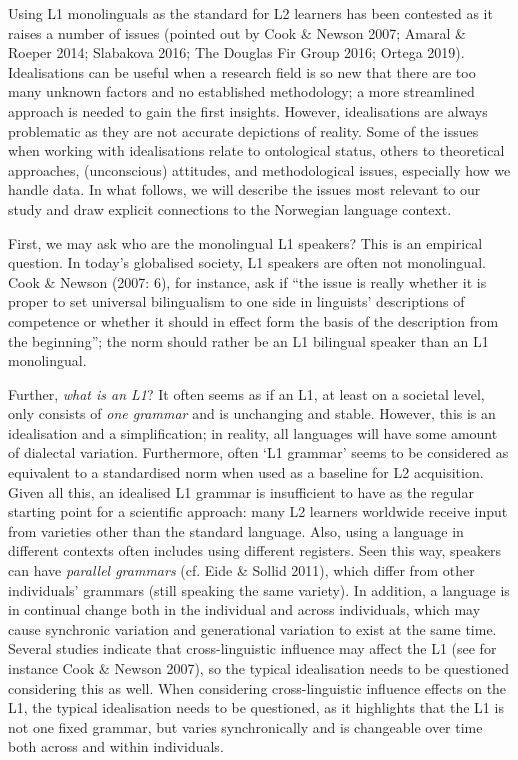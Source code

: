 \documentclass[12pt]{article}
\newenvironment{styleStandard}{\renewcommand\baselinestretch{1.0}\setlength\leftskip{0cm}\setlength\rightskip{0cm plus 1fil}\setlength\parindent{0cm}\setlength\parfillskip{0pt plus 1fil}\setlength\parskip{0in plus 1pt}\writerlistparindent\writerlistleftskip\leavevmode\normalfont\normalsize\writerlistlabel\ignorespaces}{\unskip\vspace{0in plus 1pt}\par}
\newcommand\writerlistleftskip{}
\newcommand\writerlistparindent{}
\newcommand\writerlistlabel{}
\begin{document}
\begin{styleStandard}
Using L1 monolinguals as the standard for L2 learners has been contested as it raises a number of issues (pointed out by Cook \& Newson 2007; Amaral \& Roeper 2014; Slabakova 2016; The Douglas Fir Group 2016; Ortega 2019). Idealisations can be useful when a research field is so new that there are too many unknown factors and no established methodology; a more streamlined approach is needed to gain the first insights. However, idealisations are always problematic as they are not accurate depictions of reality. Some of the issues when working with idealisations relate to ontological status, others to theoretical approaches, (unconscious) attitudes, and methodological issues, especially how we handle data. In what follows, we will describe the issues most relevant to our study and draw explicit connections to the Norwegian language context. 
\end{styleStandard}

\begin{styleStandard}
First, we may ask who are the monolingual L1 speakers? This is an empirical question. In today’s globalised society, L1 speakers are often not monolingual. Cook \& Newson (2007: 6), for instance, ask if “the issue is really whether it is proper to set universal bilingualism to one side in linguists’ descriptions of competence or whether it should in effect form the basis of the description from the beginning”; the norm should rather be an L1 bilingual speaker than an L1 monolingual.
\end{styleStandard}

\begin{styleStandard}
Further, \textit{what is an L1}? It often seems as if an L1, at least on a societal level, only consists of \textit{one grammar }and is unchanging and stable. However, this is an idealisation and a simplification; in reality, all languages will have some amount of dialectal variation. Furthermore, often ‘L1 grammar’ seems to be considered as equivalent to a standardised norm when used as a baseline for L2 acquisition. Given all this, an idealised L1 grammar is insufficient to have as the regular starting point for a scientific approach: many L2 learners worldwide receive input from varieties other than the standard language. Also, using a language in different contexts often includes using different registers. Seen this way, speakers can have \textit{parallel grammars} (cf. Eide \& Sollid 2011), which differ from other individuals’ grammars (still speaking the same variety). In addition, a language is in continual change both in the individual and across individuals, which may cause synchronic variation and generational variation to exist at the same time. Several studies indicate that cross-linguistic influence may affect the L1 (see for instance Cook \& Newson 2007), so the typical idealisation needs to be questioned considering this as well. When considering cross-linguistic influence effects on the L1, the typical idealisation needs to be questioned, as it highlights that the L1 is not one fixed grammar, but varies synchronically and is changeable over time both across and within individuals. 
\end{styleStandard}
\end{document}
